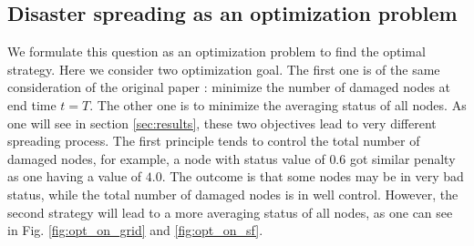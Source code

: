\subsection{Disaster spreading as an optimization problem}
We formulate this question as an optimization problem to find the optimal strategy. Here we consider two optimization goal. The first one is of the same consideration of the original paper \cite{buzna2007efficient}: minimize the number of damaged nodes at end time $t = T$. The other one is to minimize the averaging status of all nodes. As one will see in section \ref{sec:results}, these two objectives lead to very different spreading process. The first principle tends to control the total number of damaged nodes, for example, a node with status value of $0.6$ got similar penalty as one having a value of $4.0$. The outcome is that some nodes may be in very bad status, while the total number of damaged nodes is in well control. However, the second strategy will lead to a more averaging status of all nodes, as one can see in Fig. \ref{fig:opt_on_grid} and \ref{fig:opt_on_sf}.